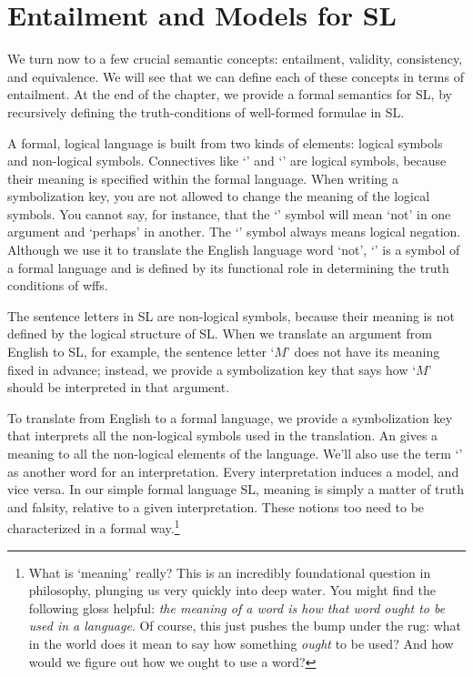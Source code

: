 \chapter{Entailment and Models for SL}
\label{ch.SLmodels}

We turn now to a few crucial semantic concepts: entailment, validity, consistency, and equivalence. We will see that we can define each of these concepts in terms of entailment. At the end of the chapter, we provide a formal semantics for SL, by recursively defining the truth-conditions of well-formed formulae in SL. 


A formal, logical language is built from two kinds of elements: logical symbols and non-logical symbols. Connectives like `\eand' and `\eif' are logical symbols, because their meaning is specified within the formal language. When writing a symbolization key, you are not allowed to change the meaning of the logical symbols. You cannot say, for instance, that the `\enot' symbol will mean `not' in one argument and `perhaps' in another. The `\enot' symbol always means logical negation. Although we use it to translate the English language word `not', `\enot' is a symbol of a formal language and is defined by its functional role in determining the truth conditions of wffs. 

The sentence letters in SL are non-logical symbols, because their meaning is not defined by the logical structure of SL. When we translate an argument from English to SL, for example, the sentence letter `$M$' does not have its meaning fixed in advance; instead, we provide a symbolization key that says how `$M$' should be interpreted in that argument.

To translate from English to a formal language, we provide a symbolization key that interprets all the non-logical symbols used in the translation. An  gives a meaning to all the non-logical elements of the language. We'll also use the term `' as another word for an interpretation. {\color{black}Every interpretation induces a model, and vice versa.} In our simple formal language SL, meaning is simply a matter of truth and falsity, relative to a given interpretation. These notions too need to be characterized in a formal way.\footnote{{\color{black}What is `meaning' really? This is an incredibly foundational question in philosophy, plunging us very quickly into deep water. You might find the following gloss helpful: \textit{the meaning of a word is how that word ought to be used in a language}. Of course, this just pushes the bump under the rug: what in the world does it mean to say how something \textit{ought} to be used? And how would we figure out how we ought to use a word?}}


